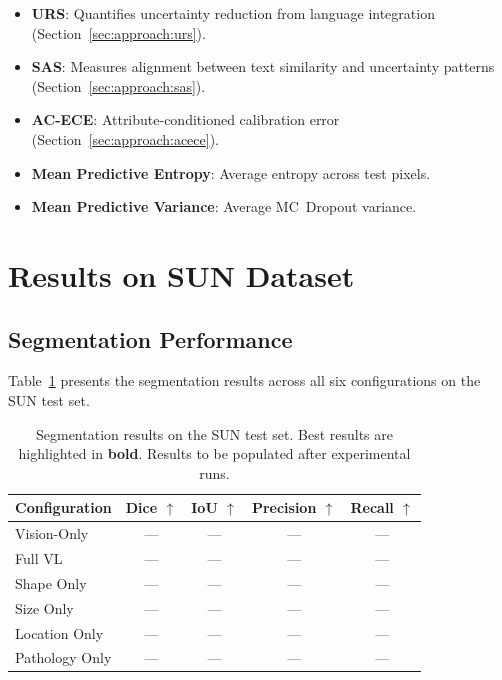 \begin{itemize}
	\item \textbf{\ac{URS}}: Quantifies uncertainty reduction from language integration (Section~\ref{sec:approach:urs}).
	\item \textbf{\ac{SAS}}: Measures alignment between text similarity and uncertainty patterns (Section~\ref{sec:approach:sas}).
	\item \textbf{\ac{AC-ECE}}: Attribute-conditioned calibration error (Section~\ref{sec:approach:acece}).
	\item \textbf{Mean Predictive Entropy}: Average entropy across test pixels.
	\item \textbf{Mean Predictive Variance}: Average MC~Dropout variance.
\end{itemize}


\section{Results on SUN Dataset}
\label{sec:eval:sun_results}

\subsection{Segmentation Performance}
\label{sec:eval:seg_results}

Table~\ref{tab:sun_results} presents the segmentation results across all six configurations on the SUN test set.

\begin{table}[htbp]
	\caption{Segmentation results on the SUN test set. Best results are highlighted in \textbf{bold}. Results to be populated after experimental runs.}
	\label{tab:sun_results}
	\centering
	\begin{tabular}{lcccc}
		\toprule
		\textbf{Configuration} & \textbf{Dice} $\uparrow$ & \textbf{IoU} $\uparrow$ & \textbf{Precision} $\uparrow$ & \textbf{Recall} $\uparrow$ \\
		\midrule
		Vision-Only      & ---    & ---    & ---    & ---    \\
		Full VL          & ---    & ---    & ---    & ---    \\
		Shape Only       & ---    & ---    & ---    & ---    \\
		Size Only        & ---    & ---    & ---    & ---    \\
		Location Only    & ---    & ---    & ---    & ---    \\
		Pathology Only   & ---    & ---    & ---    & ---    \\
		\bottomrule
	\end{tabular}
\end{table}

